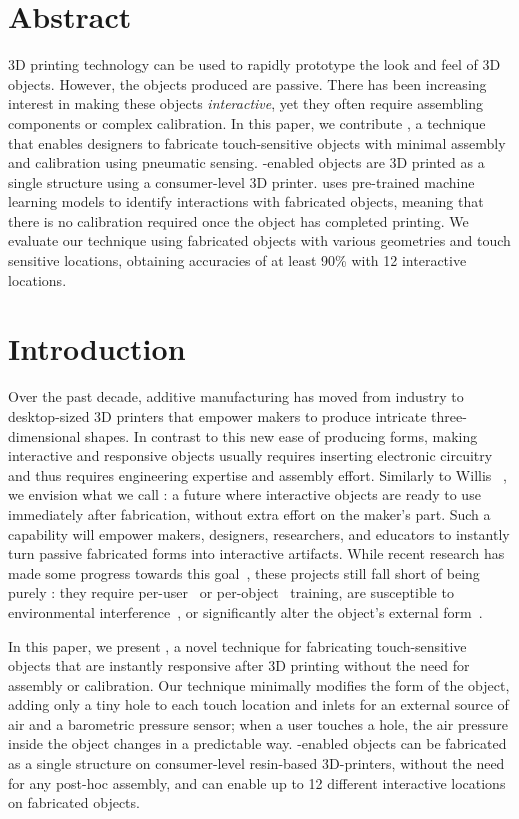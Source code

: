 	\section*{Abstract}
		3D printing technology can be used to rapidly prototype the look and feel of
		3D objects. However, the objects produced are passive. There has been
		increasing interest in making these objects \emph{interactive}, yet they
		often require assembling components or complex calibration. In this paper,
		we contribute \emph{\at}, a technique that enables designers to fabricate
		touch-sensitive objects with minimal assembly and calibration using
		pneumatic sensing. \at-enabled objects are 3D printed as a single structure
		using a consumer-level 3D printer. \at uses pre-trained machine learning
		models to identify interactions with fabricated objects, meaning that there
		is no calibration required once the object has completed printing. We
		evaluate our technique using fabricated objects with various geometries and
		touch sensitive locations, obtaining accuracies of at least 90\% with 12
		interactive locations.

	\section{Introduction}
		Over the past decade, additive manufacturing has moved from industry to
		desktop-sized 3D printers that empower makers to produce intricate
		three-dimensional shapes. In contrast to this new ease of producing forms,
		making interactive and responsive objects usually requires inserting
		electronic circuitry~\cite{Ramakers:2016, Savage:2015a} and thus requires
		engineering expertise and assembly effort. Similarly to Willis
		\etal~\cite{Willis:2012}, we envision what we call \textit{\pap}: a future
		where interactive objects are ready to use immediately after fabrication,
		without extra effort on the maker's part. Such a capability will empower
		makers, designers, researchers, and educators to instantly turn passive
		fabricated forms into interactive artifacts. While recent research has made
		some progress towards this goal~\cite{Tejada:2018, Schmitz:2019, Ono:2013,
		Shi:2016}, these projects still fall short of being purely \pap: they
		require per-user~\cite{Shi:2016} or per-object~\cite{Tejada:2018,Ono:2013}
		training, are susceptible to environmental
		interference~\cite{Tejada:2018,Shi:2016}, or significantly alter the
		object's external form~\cite{Shi:2016}.

		In this paper, we present \emph{\at}, a novel technique for fabricating
		touch-sensitive objects that are instantly responsive after 3D printing
		without the need for assembly or calibration. Our technique minimally
		modifies the form of the object, adding only a tiny hole to each touch
		location and inlets for an external source of air and a barometric pressure
		sensor; when a user touches a hole, the air pressure inside the object
		changes in a predictable way. \at-enabled objects can be fabricated as a
		single structure on consumer-level resin-based 3D-printers, without the need
		for any post-hoc assembly, and can enable up to 12 different interactive
		locations on fabricated objects.

